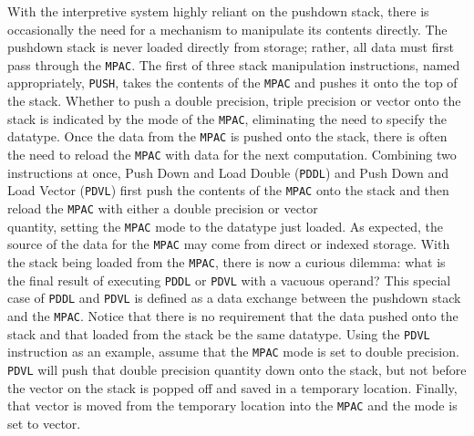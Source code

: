 \documentclass[refcap, oxford]{ahsan}
\begin{document}
With the interpretive system highly reliant on the pushdown stack, there is occasionally the need for a mechanism to manipulate its contents directly. The pushdown stack is never loaded directly from storage; rather, all data must first pass through the \texttt{MPAC}. The first of three stack manipulation instructions, named appropriately, \texttt{PUSH}, takes the contents of the \texttt{MPAC} and pushes it onto the top of the stack. Whether to push a double precision, triple precision or vector onto the stack is indicated by the mode of the \texttt{MPAC}, eliminating the need to specify the datatype. Once the data from the \texttt{MPAC} is pushed onto the stack, there is often the need to reload the \texttt{MPAC} with data for the next computation. Combining two instructions at once, Push Down and Load Double (\texttt{PDDL}) and Push Down and Load Vector (\texttt{PDVL}) first push the contents of the \texttt{MPAC} onto the stack and then reload the \texttt{MPAC} with either a double precision or vector\\
quantity, setting the \texttt{MPAC} mode to the datatype just loaded. As expected, the source of the data for the \texttt{MPAC} may come from direct or indexed storage. With the stack being loaded from the \texttt{MPAC}, there is now a curious dilemma: what is the final result of executing \texttt{PDDL} or \texttt{PDVL} with a vacuous operand? This special case of \texttt{PDDL} and \texttt{PDVL} is defined as a data exchange between the pushdown stack and the \texttt{MPAC}. Notice that there is no requirement that the data pushed onto the stack and that loaded from the stack be the same datatype. Using the \texttt{PDVL} instruction as an example, assume that the \texttt{MPAC} mode is set to double precision. \texttt{PDVL} will push that double precision quantity down onto the stack, but not before the vector on the stack is popped off and saved in a temporary location. Finally, that vector is moved from the temporary location into the \texttt{MPAC} and the mode is set to vector.
\end{document}

